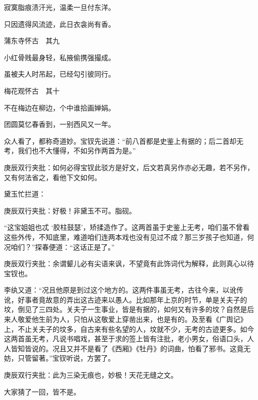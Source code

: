 \begin{poem}
\begin{pl}
        寂寞脂痕渍汗光，温柔一旦付东洋。
    \end{pl}
    \begin{pl}

        只因遗得风流迹，此日衣衾尚有香。
    \end{pl}
    \emptypl
    \begin{pl}

        蒲东寺怀古　其九
    \end{pl}
    \begin{pl}

        小红骨贱最身轻，私掖偷携强撮成。
    \end{pl}
    \begin{pl}

        虽被夫人时吊起，已经勾引彼同行。
    \end{pl}
    \emptypl
    \begin{pl}

        梅花观怀古　其十
    \end{pl}
    \begin{pl}

        不在梅边在柳边，个中谁拾画婵娟。
    \end{pl}
    \begin{pl}

        团圆莫忆春香到，一别西风又一年。
    \end{pl}
\end{poem}

\begin{parag}
    众人看了，都称奇道妙。宝钗先说道：“前八首都是史鉴上有据的；后二首却无考，我们也不大懂得，不如另作两首为是。”\begin{note}庚辰双行夹批：如何必得宝钗此驳方是好文，后文若真另作亦必无趣，若不另作，又有何法省之，看他下文如何。\end{note}黛玉忙拦道：\begin{note}庚辰双行夹批：好极！非黛玉不可。脂砚。\end{note}“这宝姐姐也忒 ‘胶柱鼓瑟’，矫揉造作了。这两首虽于史鉴上无考，咱们虽不曾看这些外传，不知底里，难道咱们连两本戏也没有见过不成？那三岁孩子也知道，何况咱们？”探春便道：“这话正是了。”\begin{note}庚辰双行夹批：余谓颦儿必有尖语来讽，不望竟有此饰词代为解释，此则真心以待宝钗也。\end{note}李纨又道：“况且他原是到过这个地方的。这两件事虽无考，古往今来，以讹传讹，好事者竟故意的弄出这古迹来以愚人。比如那年上京的时节，单是关夫子的坟，倒见了三四处。关夫子一生事业，皆是有据的，如何又有许多的坟？自然是后来人敬爱他生前为人，只怕从这敬爱上穿凿出来，也是有的。及至看《广舆记》上，不止关夫子的坟多，自古来有些名望的人，坟就不少，无考的古迹更多。如今这两首虽无考，凡说书唱戏，甚至于求的签上皆有注批，老小男女，俗语口头，人人皆知皆说的。况且又并不是看了《西厢》《牡丹》的词曲，怕看了邪书。这竟无妨，只管留著。”宝钗听说，方罢了。\begin{note}庚辰双行夹批：此为三染无痕也，妙极！天花无缝之文。\end{note}大家猜了一回，皆不是。
\end{parag}


